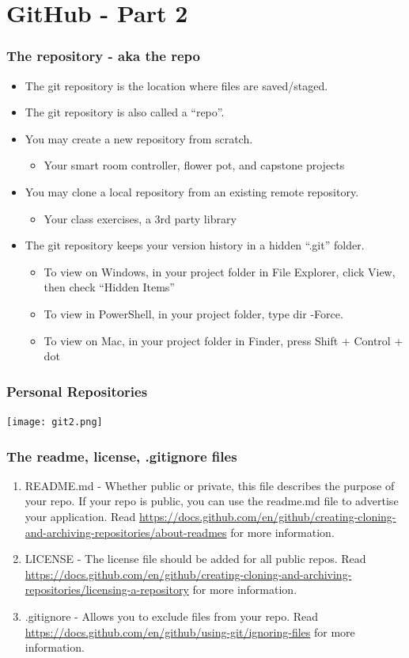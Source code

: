\documentclass{beamer}
\begin{document}
\section{GitHub - Part 2}
\label{githubsection2}

\begin{frame}\frametitle{The repository - aka the repo}
\begin{itemize}
\item The git repository is the location where files are saved/staged. 
\item The git repository is also called a “repo”.
\item You may create a new repository from scratch. 
\begin{itemize}
\item Your smart room controller, flower pot, and capstone projects
\end{itemize}
\item You may clone a local repository from an existing remote repository.
\begin{itemize}
\item Your class exercises, a 3rd party library
\end{itemize}
\item The git repository keeps your version history in a hidden “.git” folder.
\begin{itemize}
\item To view on Windows, in your project folder in File Explorer, click View, then check “Hidden Items”
\item To view in PowerShell, in your project folder, type dir -Force.
\item To view on Mac, in your project folder in Finder, press Shift + Control + dot
\end{itemize}
\end{itemize}
\end{frame}

\begin{frame}\frametitle{Personal Repositories}
\begin{center}
\texttt{[image: git2.png]}
\end{center}
\end{frame}

\begin{frame}\frametitle{The readme, license, .gitignore files}
\begin{enumerate}
\item README.md - Whether public or private, this file describes the purpose of your repo. If your repo is public, you can use the readme.md file to advertise your application. Read \url{https://docs.github.com/en/github/creating-cloning-and-archiving-repositories/about-readmes} for more information.
\item LICENSE - The license file should be added for all public repos. Read \url{https://docs.github.com/en/github/creating-cloning-and-archiving-repositories/licensing-a-repository} for more information.
\item .gitignore - Allows you to exclude files from your repo. Read \url{https://docs.github.com/en/github/using-git/ignoring-files} for more information.
\end{enumerate}
\end{frame}
\end{document}
